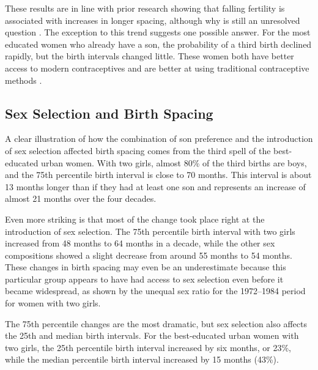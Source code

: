 \documentclass[12pt,letterpaper]{article}
\begin{document}

These results are in line with prior research showing that falling fertility is associated 
with increases in longer spacing, although why is still an unresolved question 
\citep{Casterline2016}.
The exception to this trend suggests one possible answer.
For the most educated women who already have a son, the probability of a third birth 
declined rapidly, but the birth intervals changed little.
These women both have better access to modern contraceptives and are better at using 
traditional contraceptive methods \citep{Rosenzweig1989}.





\subsection{Sex Selection and Birth Spacing}

A clear illustration of how the combination of son preference and the introduction of 
sex selection affected birth spacing comes from the third spell of the best-educated urban 
women.
With two girls, almost 80\% of the third births are boys, and the 75th percentile 
birth interval is close to 70 months. 
This interval is about 13 months longer than if they had at least one son and represents 
an increase of almost 21 months over the four decades.

Even more striking is that most of the change took place right at the introduction of sex 
selection.
The 75th percentile birth interval with two girls increased from 48 months to 
64 months in a decade, while the other sex compositions showed a slight decrease from 
around 55 months to 54 months.
These changes in birth spacing may even be an underestimate because this particular group 
appears to have had access to sex selection even before it became widespread, as shown by 
the unequal sex ratio for the 1972--1984 period for women with two girls.


The 75th percentile changes are the most dramatic, but sex selection also affects the 
25th and median birth intervals. 
For the best-educated urban women with two girls, the 25th percentile birth interval 
increased by six months, or 23\%, while the median percentile birth interval 
increased by 15 months (43\%).
\end{document}

